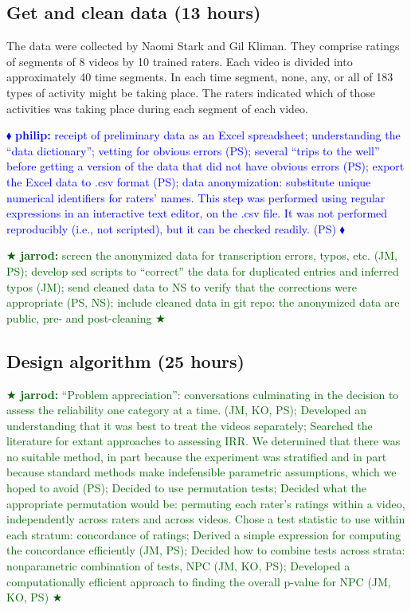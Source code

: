 \documentclass[]{article}
\newcommand{\philip}[1] { \textcolor{blue} {
\ensuremath{\blacklozenge} {\bf philip:}  {#1}
\ensuremath{\blacklozenge} } }
\newcommand{\jarrod}[1] { \textcolor{darkgreen} {
\ensuremath{\bigstar} {\bf jarrod:}  {#1}
\ensuremath{\bigstar} } }
\begin{document}
\subsection{Get and clean data (13 hours)}

The data were collected by Naomi Stark and Gil Kliman.
They comprise ratings of segments of 8 videos by 10 trained raters.
Each video is divided into approximately 40 time segments.
In each time segment, none, any, or all of 183 types of activity might be
taking place.
The raters indicated which of those activities was taking place during each
segment of each video.

\philip{
receipt of preliminary data as an Excel spreadsheet; understanding the ``data
dictionary''; vetting for obvious errors (PS);
several ``trips to the well'' before getting a version of the data that did not
have obvious errors (PS);
export the Excel data to .csv format (PS);
data anonymization: substitute unique numerical identifiers for raters' names. 
This step was performed using regular expressions in an interactive text
editor, on the .csv file.
It was not performed reproducibly (i.e., not scripted), but it can be checked
readily. (PS) 
}

\jarrod{
screen the anonymized data for transcription errors, typos, etc. (JM, PS);
develop sed scripts to ``correct'' the data for duplicated entries and inferred
typos (JM);
send cleaned data to NS to verify that the corrections were appropriate (PS, NS);
include cleaned data in git repo: the anonymized data are public, pre- and
post-cleaning
}

\subsection{Design algorithm (25 hours)}

\jarrod{
``Problem appreciation'': conversations culminating in the decision to assess
the reliability one category at a time. (JM, KO, PS);
Developed an understanding that it was best to treat the videos separately;
Searched the literature for extant approaches to assessing IRR.
We determined that there was no suitable method, in part because the experiment
was stratified and in part because standard methods make indefensible
parametric assumptions, which we hoped to avoid (PS);
Decided to use permutation tests;
Decided what the appropriate permutation would be: permuting each rater's
ratings within a video, independently across raters and across videos.
Chose a test statistic to use within each stratum: concordance of ratings;
Derived a simple expression for computing the concordance efficiently (JM, PS);
Decided how to combine tests across strata: nonparametric combination of tests,
NPC (JM, KO, PS);
Developed a computationally efficient approach to finding the overall p-value
for NPC (JM, KO, PS)
}
\end{document}
